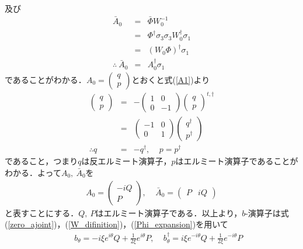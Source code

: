\documentclass[10.5pt,a4paper]{jreport}
\begin{document}
及び
\begin{eqnarray}
  \bar A_0 &=& \bar\Phi W^{-1}_0\\
  &=&\Phi^\dagger\sigma_3\sigma_3W^\dagger_0\sigma_1\\
  &=&(W_0\Phi)^\dagger\sigma_1\\
  \therefore\ \bar A_0 &=& A^\dagger_0\sigma_1 \label{A2}
\end{eqnarray}
であることがわかる．$A_0 =
\begin{pmatrix}
  q \\
  p
\end{pmatrix} $とおくと式(\ref{A1})より
\begin{eqnarray}
  \begin{pmatrix}
    q \\
    p
  \end{pmatrix}&=&- 
  \begin{pmatrix}
    1 & 0 \\
    0 & -1 
  \end{pmatrix}
  \begin{pmatrix}
    q \\
    p
  \end{pmatrix}^{t,\dagger}\\
  &=& 
  \begin{pmatrix}
    -1 & 0 \\
    0 & 1 
  \end{pmatrix}
  \begin{pmatrix}
    q^\dagger \\
    p^\dagger
  \end{pmatrix}\\
  \therefore q &=&-q^\dagger,\ \ \ \ \ p = p^\dagger 
\end{eqnarray}
であること，つまり$q$は反エルミート演算子，$p$はエルミート演算子であることがわかる．よって$A_0,\ \bar A_0$を
\begin{eqnarray}
  A_0= 
  \begin{pmatrix}
    -iQ \\
    P
  \end{pmatrix},\ \ \ \ \ 
  \bar A_0 = 
  \begin{pmatrix}
    P & iQ
  \end{pmatrix}
\end{eqnarray}
と表すことにする．$Q,\ P$はエルミート演算子である．以上より，$b$-演算子は式(\ref{zero_ajoint})，(\ref{W_difinition})，(\ref{Phi_expansion})を用いて
\begin{eqnarray}
  &&b_\theta = -i\xi e^{i\theta}Q + \frac{1}{2\xi}e^{i\theta}P,\ \ \ \ \ b^\dagger_\theta = i\xi e^{-i\theta}Q + \frac{1}{2\xi}e^{-i\theta}P
\end{eqnarray}
\end{document}
